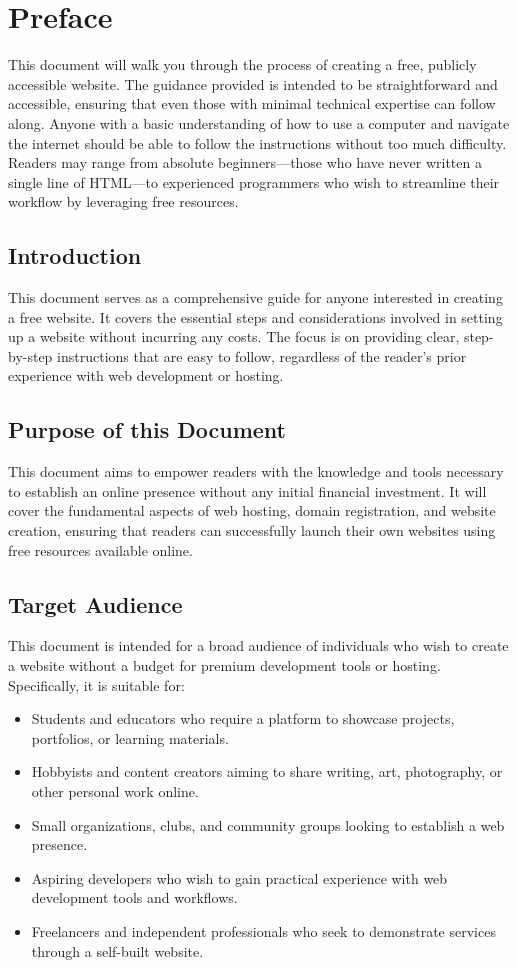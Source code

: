 \section{Preface}

This document will walk you through the process of creating a free, publicly accessible website. The guidance provided is intended to be straightforward and accessible, ensuring that even those with minimal technical expertise can follow along. Anyone with a basic understanding of how to use a computer and navigate the internet should be able to follow the instructions without too much difficulty. Readers may range from absolute beginners—those who have never written a single line of HTML—to experienced programmers who wish to streamline their workflow by leveraging free resources.
\subsection{Introduction}
This document serves as a comprehensive guide for anyone interested in creating a free website. It covers the essential steps and considerations involved in setting up a website without incurring any costs. The focus is on providing clear, step-by-step instructions that are easy to follow, regardless of the reader's prior experience with web development or hosting.
\subsection{Purpose of this Document}

This document aims to empower readers with the knowledge and tools necessary to establish an online presence without any initial financial investment. It will cover the fundamental aspects of web hosting, domain registration, and website creation, ensuring that readers can successfully launch their own websites using free resources available online.

\subsection{Target Audience}

This document is intended for a broad audience of individuals who wish to create a website without a budget for premium development tools or hosting. Specifically, it is suitable for:

\begin{itemize}
    \item Students and educators who require a platform to showcase projects, portfolios, or learning materials.
    \item Hobbyists and content creators aiming to share writing, art, photography, or other personal work online.
    \item Small organizations, clubs, and community groups looking to establish a web presence.
    \item Aspiring developers who wish to gain practical experience with web development tools and workflows.
    \item Freelancers and independent professionals who seek to demonstrate services through a self-built website.
\end{itemize}

